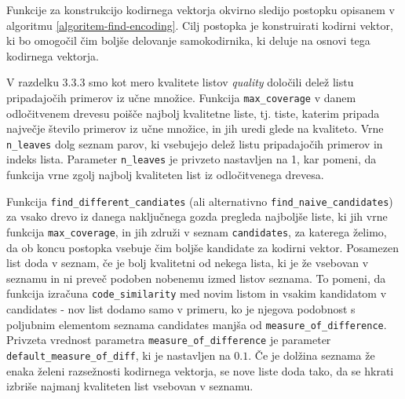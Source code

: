 \documentclass[12pt,a4paper]{article}
\begin{document}


Funkcije za konstrukcijo kodirnega vektorja okvirno sledijo postopku opisanem v algoritmu \ref{algoritem-find-encoding}.
Cilj postopka je konstruirati kodirni vektor, ki bo omogočil čim boljše delovanje samokodirnika, ki deluje na osnovi tega kodirnega vektorja. %

V razdelku 3.3.3 smo kot mero kvalitete listov \textit{quality} določili delež listu pripadajočih primerov iz učne množice. 
Funkcija \texttt{max\_coverage} v danem odločitvenem drevesu poišče najbolj kvalitetne liste, tj. tiste, katerim pripada največje število primerov iz učne množice, in jih uredi glede na kvaliteto.
Vrne \texttt{n\_leaves} dolg seznam parov, ki vsebujejo delež listu pripadajočih primerov in indeks lista. 
Parameter \texttt{n\_leaves} je privzeto nastavljen na 1, kar pomeni, da funkcija vrne zgolj najbolj kvaliteten list iz odločitvenega drevesa.

Funkcija \texttt{find\_different\_candiates} (ali alternativno \texttt{find\_naive\_candidates}) za vsako drevo iz danega naključnega gozda pregleda najboljše liste, 
ki jih vrne funkcija \texttt{max\_coverage}, in jih združi v seznam \texttt{candidates}, za katerega želimo, da ob koncu postopka vsebuje čim boljše kandidate za kodirni vektor.
Posamezen list doda v seznam, če je bolj kvalitetni od nekega lista, ki je že vsebovan v seznamu in ni preveč podoben nobenemu izmed listov seznama.
To pomeni, da funkcija izračuna \texttt{code\_similarity} med novim listom in vsakim kandidatom v candidates - nov list dodamo samo v primeru, ko je njegova podobnost s poljubnim elementom seznama candidates manjša od \texttt{measure\_of\_difference}.
Privzeta vrednost parametra \texttt{measure\_of\_difference} je parameter \texttt{default\_measure\_of\_diff}, ki je nastavljen na $0.1$.
Če je dolžina seznama že enaka želeni razsežnosti kodirnega vektorja, se nove liste doda tako, da se hkrati izbriše najmanj kvaliteten list vsebovan v seznamu.
\end{document}
